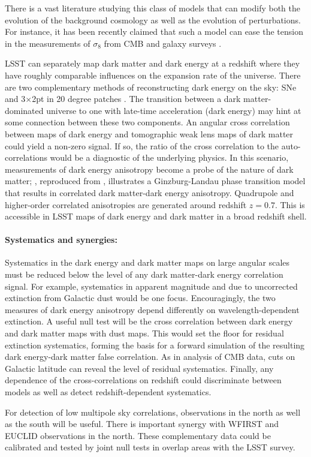 There is a vast literature studying this class of models that can modify both the evolution of the 
background cosmology as well as the evolution of perturbations. For instance, it has been recently claimed
that such a model can ease the tension in the measurements of $\sigma_8$ from CMB and galaxy surveys 
\citep{Barros:2018efl}.

LSST can separately map dark matter and dark energy at a redshift where they have roughly comparable influences on the expansion rate of the universe. 
There are two complementary methods of reconstructing dark energy on the sky: SNe and 3$\times$2pt in 20 degree patches \citep[Figure 15.9 in ][]{0912.0201}.
The transition between a dark matter-dominated universe to one with late-time acceleration (dark energy) may hint at some connection between these two components. 
An angular cross correlation between maps of dark energy and tomographic weak lens maps of dark matter could yield a non-zero signal.  
If so, the ratio of the cross correlation to the auto-correlations would be a diagnostic of the underlying physics. 
In this scenario, measurements of dark energy anisotropy become a probe of the nature of dark matter; , reproduced from \cite{1810.11007}, illustrates a Ginzburg-Landau phase transition model that results in correlated dark matter-dark energy anisotropy. 
Quadrupole and higher-order correlated anisotropies are generated around redshift $z=0.7$.  
This is accessible in LSST maps of dark energy and dark matter in a broad redshift shell.

\paragraph{Systematics and synergies:}
Systematics in the dark energy and dark matter maps on large angular scales must be reduced below the level of any dark matter-dark energy correlation signal.  
For example, systematics in apparent magnitude and \photoz due to uncorrected extinction from Galactic dust would be one focus. 
Encouragingly, the two measures of dark energy anisotropy depend differently on wavelength-dependent extinction. 
A useful null test will be the cross correlation between dark energy and dark matter maps with dust maps.  
This would set the floor for residual extinction systematics, forming the basis for a forward simulation of the resulting dark energy-dark matter false correlation. 
As in analysis of CMB data, cuts on Galactic latitude can reveal the level of residual systematics. 
Finally, any dependence of the cross-correlations on redshift could discriminate between models as well as detect redshift-dependent systematics.

For detection of low multipole sky correlations, observations in the north as well as the south will be useful.
There is important synergy with WFIRST and EUCLID observations in the north.  
These complementary data could be calibrated and tested by joint null tests in overlap areas with the LSST survey.